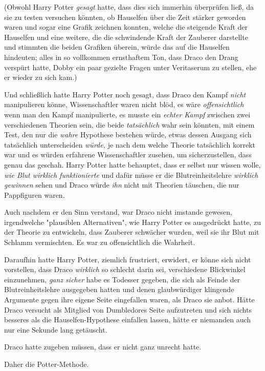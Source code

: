 {(Obwohl Harry Potter \emph{gesagt} hatte, dass dies sich immerhin überprüfen ließ, da sie zu testen versuchen könnten, ob Hauselfen über die Zeit stärker geworden waren und sogar eine Grafik zeichnen konnten, welche die steigende Kraft der Hauselfen und eine weitere, die die schwindende Kraft der Zauberer darstellte und stimmten die beiden Grafiken überein, würde das auf die Hauselfen hindeuten; alles in so vollkommen ernsthaftem Ton, dass Draco den Drang verspürt hatte, Dobby ein paar gezielte Fragen unter Veritaserum zu stellen, ehe er wieder zu sich kam.)

Und schließlich hatte Harry Potter noch gesagt, dass Draco den Kampf \emph{nicht} manipulieren könne, Wissenschaftler waren nicht blöd, es wäre \emph{offensichtlich} wenn man den Kampf manipulierte, es musste ein \emph{echter Kampf} zwischen zwei verschiedenen Theorien sein, die beide \emph{tatsächlich} wahr sein könnten, mit einem Test, den nur die \emph{wahre} Hypothese bestehen würde, etwas dessen Ausgang sich tatsächlich unterscheiden \emph{würde,} je nach dem welche Theorie tatsächlich korrekt war und es würden erfahrene Wissenschaftler zusehen, um sicherzustellen, dass genau das geschah. Harry Potter hatte behauptet, dass er selbst nur wissen wolle, \emph{wie Blut wirklich funktionierte} und dafür müsse er die Blutreinheitslehre \emph{wirklich} \emph{gewinnen} sehen und Draco würde \emph{ihn} nicht mit Theorien täuschen, die nur Pappfiguren waren.

Auch nachdem er den Sinn verstand, war Draco nicht imstande gewesen, irgendwelche "plausiblen Alternativen", wie Harry Potter es ausgedrückt hatte, zu der Theorie zu entwickeln, dass Zauberer schwächer wurden, weil sie ihr Blut mit Schlamm vermischten. Es war zu offensichtlich die Wahrheit.

Daraufhin hatte Harry Potter, ziemlich frustriert, erwidert, er könne sich nicht vorstellen, dass Draco \emph{wirklich} so schlecht darin sei, verschiedene Blickwinkel einzunehmen, \emph{ganz sicher} habe es Todesser gegeben, die sich als Feinde der Blutreinheitslehre ausgegeben hatten und denen glaubwürdiger klingende Argumente gegen ihre eigene Seite eingefallen waren, als Draco sie anbot. Hätte Draco versucht als Mitglied von Dumbledores Seite aufzutreten und sich nichts besseres als die Hauselfen-Hypothese einfallen lassen, hätte er niemanden auch nur eine Sekunde lang getäuscht.

Draco hatte zugeben müssen, dass er nicht ganz unrecht hatte.

Daher die Potter-Methode.

}
